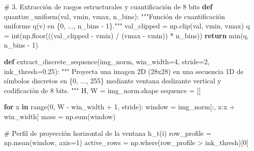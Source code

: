 \documentclass[
  spanish,
  us-letterpaper,
]{scrreprt}
\newenvironment{Shaded}{\begin{snugshade}}{\end{snugshade}}
\newcommand{\BuiltInTok}[1]{\textcolor[rgb]{0.00,0.23,0.31}{#1}}
\newcommand{\CommentTok}[1]{\textcolor[rgb]{0.37,0.37,0.37}{#1}}
\newcommand{\ControlFlowTok}[1]{\textcolor[rgb]{0.00,0.23,0.31}{\textbf{#1}}}
\newcommand{\DecValTok}[1]{\textcolor[rgb]{0.68,0.00,0.00}{#1}}
\newcommand{\FloatTok}[1]{\textcolor[rgb]{0.68,0.00,0.00}{#1}}
\newcommand{\KeywordTok}[1]{\textcolor[rgb]{0.00,0.23,0.31}{\textbf{#1}}}
\newcommand{\NormalTok}[1]{\textcolor[rgb]{0.00,0.23,0.31}{#1}}
\newcommand{\OperatorTok}[1]{\textcolor[rgb]{0.37,0.37,0.37}{#1}}
\theoremstyle{definition}
\theoremstyle{remark}
\begin{document}
\label{hmm-extraccion-division}
\begin{Shaded}
\begin{Highlighting}[]
\CommentTok{\# 3. Extracción de rasgos estructurales y cuantificación de 8 bits}
\KeywordTok{def}\NormalTok{ quantize\_uniform(val, vmin, vmax, n\_bins):}
    \CommentTok{"""Función de cuantificación uniforme q(v) en \{0, ..., n\_bins {-} 1\}."""}
\NormalTok{    val\_clipped }\OperatorTok{=}\NormalTok{ np.clip(val, vmin, vmax)}
\NormalTok{    q }\OperatorTok{=} \BuiltInTok{int}\NormalTok{(np.floor(((val\_clipped }\OperatorTok{{-}}\NormalTok{ vmin) }\OperatorTok{/}\NormalTok{ (vmax }\OperatorTok{{-}}\NormalTok{ vmin)) }\OperatorTok{*}\NormalTok{ n\_bins))}
    \ControlFlowTok{return} \BuiltInTok{min}\NormalTok{(q, n\_bins }\OperatorTok{{-}} \DecValTok{1}\NormalTok{)}

\KeywordTok{def}\NormalTok{ extract\_discrete\_sequence(img\_norm, win\_width}\OperatorTok{=}\DecValTok{4}\NormalTok{, stride}\OperatorTok{=}\DecValTok{2}\NormalTok{, ink\_thresh}\OperatorTok{=}\FloatTok{0.25}\NormalTok{):}
    \CommentTok{"""}
\CommentTok{    Proyecta una imagen 2D (28x28) en una secuencia 1D de símbolos discretos}
\CommentTok{    en \{0, ..., 255\} mediante ventana deslizante vertical y codificación de 8 bits.}
\CommentTok{    """}
\NormalTok{    H, W }\OperatorTok{=}\NormalTok{ img\_norm.shape}
\NormalTok{    sequence }\OperatorTok{=}\NormalTok{ []}

    \ControlFlowTok{for}\NormalTok{ x }\KeywordTok{in} \BuiltInTok{range}\NormalTok{(}\DecValTok{0}\NormalTok{, W }\OperatorTok{{-}}\NormalTok{ win\_width }\OperatorTok{+} \DecValTok{1}\NormalTok{, stride):}
\NormalTok{        window }\OperatorTok{=}\NormalTok{ img\_norm[:, x:x }\OperatorTok{+}\NormalTok{ win\_width]}
\NormalTok{        mass }\OperatorTok{=}\NormalTok{ np.}\BuiltInTok{sum}\NormalTok{(window)}

        \CommentTok{\# Perfil de proyección horizontal de la ventana h\_t(i)}
\NormalTok{        row\_profile }\OperatorTok{=}\NormalTok{ np.mean(window, axis}\OperatorTok{=}\DecValTok{1}\NormalTok{)}
\NormalTok{        active\_rows }\OperatorTok{=}\NormalTok{ np.where(row\_profile }\OperatorTok{\textgreater{}}\NormalTok{ ink\_thresh)[}\DecValTok{0}\NormalTok{]}


\end{Highlighting}
\end{Shaded}
\end{document}
